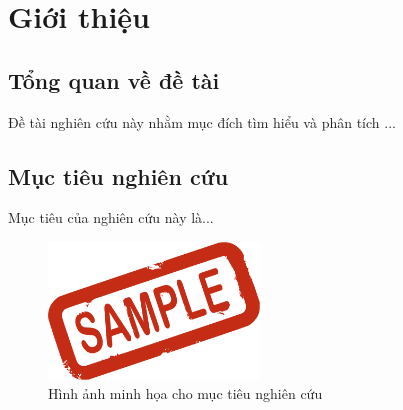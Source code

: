 \section{Giới thiệu}
\subsection{Tổng quan về đề tài}
Đề tài nghiên cứu này nhằm mục đích tìm hiểu và phân tích \cite{CitekeyArticle}...
\subsection{Mục tiêu nghiên cứu}
Mục tiêu của nghiên cứu \cite{CitekeyBook} này là...

\begin{figure}[h]
    \centering
    \includegraphics[width=0.5\textwidth]{images/image.png}
    \caption{Hình ảnh minh họa cho mục tiêu nghiên cứu}
    \label{fig:goal}
\end{figure}

